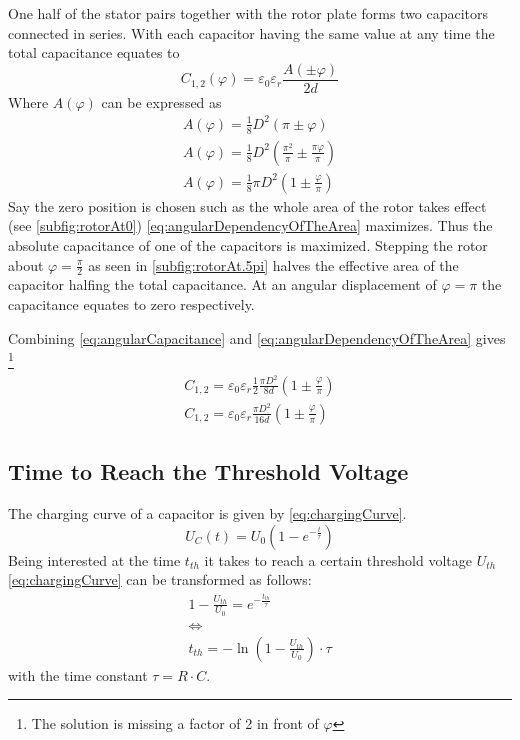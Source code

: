         One half of the stator pairs together with the rotor plate forms two capacitors connected in series. With each
        capacitor having the same value at any time the total capacitance equates to
        \begin{equation}
            C_{1,2}(\varphi) = \varepsilon_0 \varepsilon_r \frac{A(\pm\varphi)}{2d}
            \label{eq:angularCapacitance}
        \end{equation}
        Where \( A(\varphi) \) can be expressed as
        \begin{align}
            A(\varphi) = \frac{1}{8}D^2 \left( \pi \pm \varphi \right) \nonumber \\
            A(\varphi) = \frac{1}{8}D^2 \left( \frac{\pi^2}{\pi} \pm \frac{\pi\varphi}{\pi} \right) \nonumber \\
            A(\varphi) = \frac{1}{8} \pi D^2 \left( 1 \pm \frac{\varphi}{\pi}\right)
            \label{eq:angularDependencyOfTheArea}
        \end{align}
        Say the zero position is chosen such as the whole area of the rotor takes effect (see \cref{subfig:rotorAt0})
        \cref{eq:angularDependencyOfTheArea} maximizes. Thus the absolute capacitance of one of the capacitors is maximized.
        Stepping the rotor about \( \varphi = \frac{\pi}{2} \) as seen in \cref{subfig:rotorAt.5pi} halves the
        effective area of the capacitor halfing the total capacitance. At an angular displacement of \( \varphi = \pi \)
        the capacitance equates to zero respectively.\par
        Combining \cref{eq:angularCapacitance} and \cref{eq:angularDependencyOfTheArea} gives \footnote{The solution is missing a factor of 2 in front of \(\varphi\)}
        \begin{align}
            C_{1,2} = \varepsilon_0 \varepsilon_r \frac{1}{2} \frac{\pi D^2}{8d} \left( 1 \pm \frac{\varphi}{\pi} \right) \nonumber \\
            C_{1,2} = \varepsilon_0 \varepsilon_r \frac{\pi D^2}{16d} \left( 1 \pm \frac{\varphi}{\pi} \right)
        \end{align}
    \subsection*{Time to Reach the Threshold Voltage}
        The charging curve of a capacitor is given by \cref{eq:chargingCurve}.
        \begin{equation}
            U_C(t) = U_0 ( 1-e^{-\frac{t}{\tau}})
            \label{eq:chargingCurve}
        \end{equation}
        Being interested at the time \( t_{th} \) it takes to reach a certain threshold voltage \( U_{th} \) \cref{eq:chargingCurve}
        can be transformed as follows:
        \begin{align}
            1- \frac{U_{th}}{U_0} = e^{-\frac{t_{th}}{\tau}} \nonumber \\
            \Leftrightarrow \nonumber \\
            t_{th} = - \ln(1- \frac{U_{th}}{U_0}) \cdot \tau
            \label{eq:timeToThresholfVoltage}
        \end{align}
        with the time constant \( \tau = R \cdot C \).
